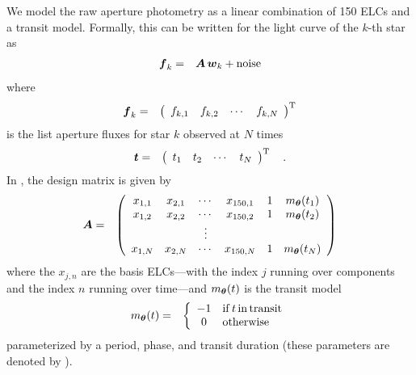 We model the raw aperture photometry as a linear combination of 150 ELCs and
a transit model.
Formally, this can be written for the light curve of the $k$-th star as
\begin{eqnarray}\eqlabel{linear-model}
\bvec{f}_k &=& \bvec{A}\,\bvec{w}_k + \mathrm{noise}
\end{eqnarray}
where
\begin{eqnarray}
{\ensuremath{\boldsymbol{f}}}_k &=& \left (\begin{array}{cccc}
    f_{k,1} & f_{k,2} & \cdots & f_{k,N}
\end{array}\right )^{\mathrm{T}}
\end{eqnarray}
is the list aperture fluxes for star $k$ observed at $N$ times
\begin{eqnarray}
{\ensuremath{\boldsymbol{t}}} &=& \left (\begin{array}{cccc}
    t_{1} & t_{2} & \cdots & t_{N}
\end{array}\right )^{\mathrm{T}} \quad.
\end{eqnarray}
In , the design matrix is given by
\begin{eqnarray}
{\ensuremath{\boldsymbol{A}}} &=& \left (\begin{array}{cccccc}
    x_{1,1} & x_{2,1} & \cdots & x_{150,1} & 1 & m_{\boldsymbol{\theta}}(t_1) \\
    x_{1,2} & x_{2,2} & \cdots & x_{150,2} & 1 & m_{\boldsymbol{\theta}}(t_2) \\
    && \vdots &&&\\
    x_{1,N} & x_{2,N} & \cdots & x_{150,N} & 1 & m_{\boldsymbol{\theta}}(t_N)
\end{array}\right )
\end{eqnarray}
where the $x_{j,n}$ are the basis ELCs---with the index $j$ running over
components and the index $n$ running over time---and $m_{\boldsymbol{\theta}}(t)$ is
the transit model
\begin{eqnarray}
m_{\boldsymbol{\theta}}(t) &=& \left\{\begin{array}{cl}
-1 & \mathrm{if\,}t\,\mathrm{in\,transit} \\
0 & \mathrm{otherwise}
\end{array}\right.
\end{eqnarray}
parameterized by a period, phase, and transit duration (these parameters are
denoted by \bvec{\theta}).

